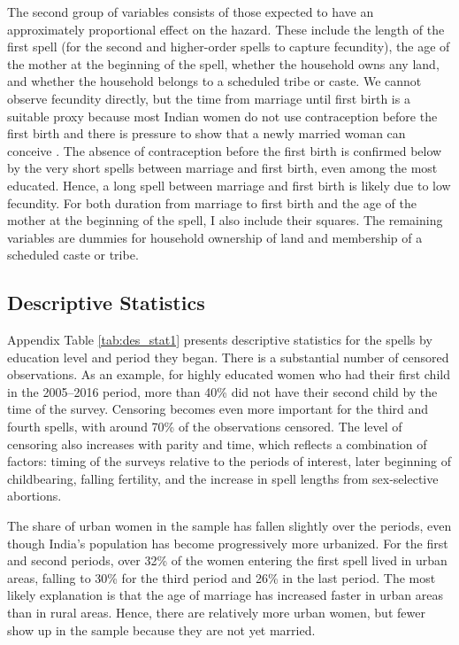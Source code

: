 \documentclass[12pt,letterpaper]{article}
\begin{document}
The second group of variables consists of those expected to have an 
approximately proportional effect on the hazard.
These include the length of the first spell 
(for the second and higher-order spells to capture fecundity), 
the age of the mother at the beginning of the spell, 
whether the household owns any land, 
and whether the household belongs to a scheduled tribe or caste.
We cannot observe fecundity directly, but the time from marriage until 
first birth is a suitable proxy because most Indian women do not use 
contraception before the first birth and there is pressure to show that 
a newly married woman can conceive \citep{dyson83,Sethuraman2007,Dommaraju2009}.
The absence of contraception before the first birth is confirmed below by the 
very short spells between marriage and first birth, even among the most educated.
Hence, a long spell between marriage and first birth is likely due to low fecundity.
For both duration from marriage to first birth and the age of the mother at the 
beginning of the spell, I also include their squares.
The remaining variables are dummies for household ownership of land and membership
of a scheduled caste or tribe.


\subsection{Descriptive Statistics}

Appendix Table \ref{tab:des_stat1} presents descriptive statistics for
the spells by education level and period they began.
There is a substantial number of censored observations.
As an example, for highly educated women who had their first child in the 2005--2016
period, more than 40\% did not have their second child by the time of the survey.
Censoring becomes even more important for the third and fourth
spells, with around 70\% of the observations censored.
The level of censoring also increases with parity and time,
which reflects a combination of factors: timing of the surveys
relative to the periods of interest, later beginning of childbearing, 
falling fertility, and the increase in spell lengths from 
sex-selective abortions.

The share of urban women in the sample has fallen slightly over the
periods, even though India's population has become progressively more urbanized.
For the first and second periods, over 32\% of the women 
entering the first spell lived in urban areas, falling to 
30\% for the third period and 26\% in the last period.
The most likely explanation is that the age of marriage has increased
faster in urban areas than in rural areas.
Hence, there are relatively more urban women, but fewer show up in the
sample because they are not yet married.
\end{document}
